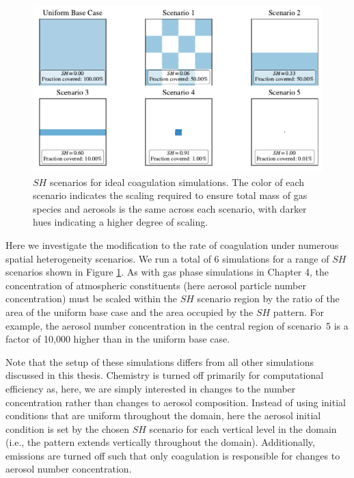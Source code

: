 \begin{figure}[h]
  \centering
    \includegraphics[width=\textwidth]{figures/chapter5/ideal-coag/ideal-coag-SH-scenarios.pdf}
    \caption{$SH$ scenarios for ideal coagulation simulations. The color of each scenario indicates the scaling required to ensure total mass of gas species and aerosols is the same across each scenario, with darker hues indicating a higher degree of scaling.}
    \label{fig:sh-scenarios-ideal-coag}
\end{figure}

Here we investigate the modification to the rate of coagulation under numerous spatial heterogeneity scenarios. We run a total of 6 simulations for a range of $SH$ scenarios shown in Figure \ref{fig:sh-scenarios-ideal-coag}. As with gas phase simulations in Chapter 4, the concentration of atmospheric constituents (here aerosol particle number concentration) must be scaled within the $SH$ scenario region by the ratio of the area of the uniform base case and the area occupied by the $SH$ pattern. For example, the aerosol number concentration in the central region of scenario~5 is a factor of 10,000 higher than in the uniform base case. 

Note that the setup of these simulations differs from all other simulations discussed in this thesis. Chemistry is turned off primarily for computational efficiency as, here, we are simply interested in changes to the number concentration rather than changes to aerosol composition. Instead of using initial conditions that are uniform throughout the domain, here the aerosol initial condition is set by the chosen $SH$ scenario for each vertical level in the domain (i.e., the pattern extends vertically throughout the domain). Additionally, emissions are turned off such that only coagulation is responsible for changes to aerosol number concentration.

